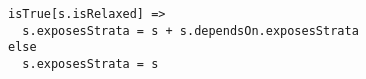 \lstset{frame=tb, aboveskip=12pt, belowskip=-3pt, breaklines=true, basicstyle=\small\ttfamily, tabsize=2, mathescape=true}
\begin{lstlisting}[caption={facts.als, lines 21-24}, label=alloy:STRATUM_VISIBILITY, captionpos=b]
isTrue[s.isRelaxed] =>
  s.exposesStrata = s + s.dependsOn.exposesStrata
else
  s.exposesStrata = s
\end{lstlisting}
